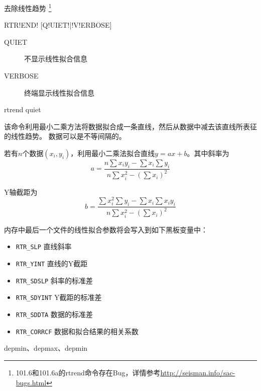 \label{cmd:rtrend}

去除线性趋势
\footnote{101.6和101.6a的rtrend命令存在Bug，详情参考\url{http://seisman.info/sac-bugs.html}}

\begin{SACSTX}
RTR!END! [Q!UIET!|!V!ERBOSE]
\end{SACSTX}

\begin{description}
\item [QUIET] 不显示线性拟合信息
\item [VERBOSE] 终端显示线性拟合信息
\end{description}

\begin{SACDFT}
rtrend quiet
\end{SACDFT}

该命令利用最小二乘方法将数据拟合成一条直线，然后从数据中减去该直线所表征的线性趋势。
数据可以是不等间隔的。

若有$n$个数据$(x_i,y_i)$，利用最小二乘法拟合直线$y=ax+b$。其中斜率为
\[
    a = \frac{n\sum x_i y_i - \sum x_i \sum y_i}
    {n\sum x_i^2 - (\sum x_i)^2}
\]

Y轴截距为
\[
    b = \frac{\sum x_i^2 \sum y_i - \sum x_i \sum x_i y_i}
    {n\sum x_i^2 - (\sum x_i)^2}
\]

内存中最后一个文件的线性拟合参数将会写入到如下黑板变量中：
\begin{itemize}
\item \verb|RTR_SLP| 直线斜率
\item \verb|RTR_YINT| 直线的Y截距
\item \verb|RTR_SDSLP| 斜率的标准差
\item \verb|RTR_SDYINT| Y截距的标准差
\item \verb|RTR_SDDTA| 数据的标准差
\item \verb|RTR_CORRCF| 数据和拟合结果的相关系数
\end{itemize}

depmin、depmax、depmin
